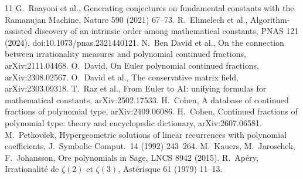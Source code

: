\documentclass[11pt]{article}
\begin{document}
\begin{thebibliography}{11}
 G.~Raayoni et al., Generating conjectures on fundamental constants with the Ramanujan Machine, Nature 590 (2021) 67--73.
 R.~Elimelech et al., Algorithm-assisted discovery of an intrinsic order among mathematical constants, PNAS 121 (2024), doi:10.1073/pnas.2321440121.
 N.~Ben David et al., On the connection between irrationality measures and polynomial continued fractions, arXiv:2111.04468.
 O.~David, On Euler polynomial continued fractions, arXiv:2308.02567.
 O.~David et al., The conservative matrix field, arXiv:2303.09318.
 T.~Raz et al., From Euler to AI: unifying formulas for mathematical constants, arXiv:2502.17533.
 H.~Cohen, A database of continued fractions of polynomial type, arXiv:2409.06086.
 H.~Cohen, Continued fractions of polynomial type: theory and encyclopedic dictionary, arXiv:2607.06581.
 M.~Petkov\v sek, Hypergeometric solutions of linear recurrences with polynomial coefficients, J.\ Symbolic Comput.\ 14 (1992) 243--264.
 M.~Kauers, M.~Jaroschek, F.~Johansson, Ore polynomials in Sage, LNCS 8942 (2015).
 R.~Ap\'ery, Irrationalit\'e de $\zeta(2)$ et $\zeta(3)$, Ast\'erisque 61 (1979) 11--13.
\end{thebibliography}
\end{document}
